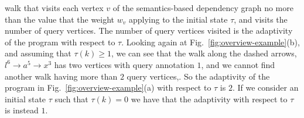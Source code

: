   walk  that visits each vertex $v$ of the semantics-based dependency graph no more than the value that the weight $w_v$ applying to the initial state $\tau$, and visits the  number of query vertices.
The number of query vertices visited is the adaptivity of the program with respect to $\tau$.
Looking again at Fig.~\ref{fig:overview-example}(b), and assuming that $\tau(k) \geq 1$, we can see that the 
walk along the dashed arrows,  $l^{6} \to a^5 \to x^3 $ has two vertices with query annotation $1$, and we cannot find another walk having more than $2$ query vertices,. So the adaptivity of the program in Fig.~\ref{fig:overview-example}(a) with respect to $\tau$ is $2$. If we consider an initial state $\tau$ such that $\tau(k)=0$ we have that the adaptivity with respect to $\tau$ is instead $1$. 

